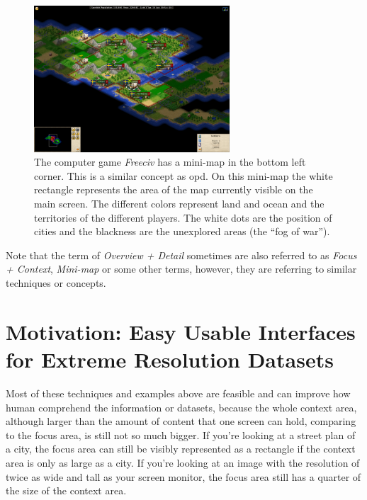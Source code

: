 \begin{figure}[th]
\centering
\includegraphics[width=0.65\textwidth,keepaspectratio]{Figures/Chapter1/minimap.png}
\decoRule
\caption[Overview Plus Detail in Computer Games]{The computer game \emph{Freeciv} has a mini-map in the bottom left corner. This is a similar concept as \gls{opd}. On this mini-map the white rectangle represents the area of the map currently visible on the main screen. The different colors represent land and ocean and the territories of the different players. The white dots are the position of cities and the blackness are the unexplored areas (the ``fog of war'')\cite{wiki:minimap}.}
\label{fig:minimap}
\end{figure}

Note that the term of \emph{Overview + Detail} sometimes are also referred to as \emph{Focus + Context}, \emph{Mini-map} or some other terms, however, they are referring to similar techniques or concepts. 


\section{Motivation: Easy Usable Interfaces for Extreme Resolution Datasets}

Most of these techniques and examples above are feasible and can improve how human comprehend the information or datasets, because the whole context area, although larger than the amount of content that one screen can hold, comparing to the focus area, is still not so much bigger. If you're looking at a street plan of a city, the focus area can still be visibly represented as a rectangle if the context area is only as large as a city. If you're looking at an image with the resolution of twice as wide and tall as your screen monitor, the focus area still has a quarter of the size of the context area.

